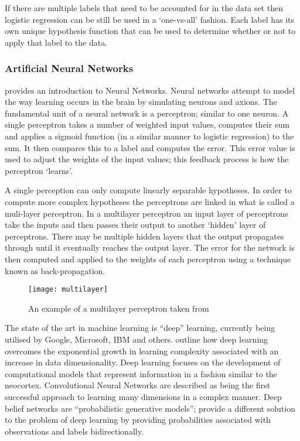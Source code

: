 If there are multiple labels that need to be accounted for in the data set then logistic regression can be still be used in a `one-vs-all' fashion. Each label has its own unique hypothesis function that can be used to determine whether or not to apply that label to the data.

\subsubsection{Artificial Neural Networks}

\cite{shiffman2012nature} provides an introduction to Neural Networks. Neural networks attempt to model the way learning occurs in the brain by simulating neurons and axions. The fundamental unit of a neural network is a perceptron; similar to one neuron. A single perceptron takes a number of weighted input values, computes their sum and applies a sigmoid function (in a similar manner to logistic regression) to the sum. It then compares this to a label and computes the error. This error value is used to adjust the weights of the input values; this feedback process is how the perceptron `learns'. 

A single perception can only compute linearly separable hypotheses. In order to compute more complex hypotheses the perceptrons are linked in what is called a muli-layer perceptron. In a multilayer perceptron an input layer of perceptrons take the inputs and then passes their output to another `hidden' layer of perceptrons. There may be multiple hidden layers that the output propagates through until it eventually reaches the output layer. The error for the network is then computed and applied to the weights of each perceptron using a technique known as back-propagation.

\begin{figure}[!h]
\centering
\texttt{[image: multilayer]}
\caption{An example of a multilayer perceptron taken from \cite{shiffman2012nature}}
\label{fig:my_label}
\end{figure}

The state of the art in machine learning is “deep” learning, currently being utilised by Google, Microsoft, IBM and others. \cite{arel2010deep} outline how deep learning overcomes the exponential growth in learning complexity associated with an increase in data dimensionality. Deep learning focuses on the development of computational models that represent information in a fashion similar to the neocortex. Convolutional Neural Networks are described as being the first successful approach to learning many dimensions in a complex manner. Deep belief networks are “probabilistic generative models”; provide a different solution to the problem of deep learning by providing probabilities associated with observations and labels bidirectionally.

